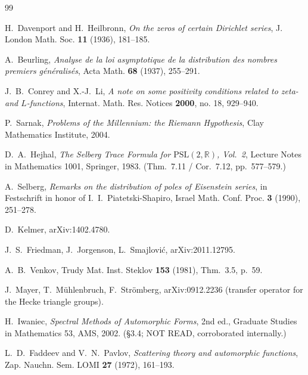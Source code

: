 \documentclass[11pt]{amsart}
\theoremstyle{remark}
\begin{document}
\begin{thebibliography}{99}

 H.~Davenport and H.~Heilbronn, \emph{On the zeros of
certain Dirichlet series}, J. London Math. Soc. \textbf{11} (1936),
181--185. %

 A.~Beurling, \emph{Analyse de la loi asymptotique
de la distribution des nombres premiers g\'en\'eralis\'es}, Acta Math.
\textbf{68} (1937), 255--291. %

 J.~B.~Conrey and X.-J.~Li, \emph{A note on some
positivity conditions related to zeta- and $L$-functions}, Internat.
Math. Res. Notices \textbf{2000}, no. 18, 929--940.

 P.~Sarnak, \emph{Problems of the Millennium: the
Riemann Hypothesis}, Clay Mathematics Institute, 2004.

 D.~A.~Hejhal, \emph{The Selberg Trace Formula for
$\mathrm{PSL}(2,\mathbb R)$, Vol.\ 2}, Lecture Notes in Mathematics 1001,
Springer, 1983. (Thm.\ 7.11 / Cor.\ 7.12, pp.\ 577--579.)

 A.~Selberg, \emph{Remarks on the distribution of
poles of Eisenstein series}, in Festschrift in honor of I.~I.~Piatetski-Shapiro,
Israel Math. Conf. Proc. \textbf{3} (1990), 251--278. %

 D.~Kelmer, arXiv:1402.4780. %

 J.~S.~Friedman, J.~Jorgenson, L.~Smajlovi\'c,
arXiv:2011.12795. %

 A.~B.~Venkov, Trudy Mat. Inst. Steklov \textbf{153}
(1981), Thm.\ 3.5, p.\ 59. %

 J.~Mayer, T.~M\"uhlenbruch, F.~Str\"omberg,
arXiv:0912.2236 (transfer operator for the Hecke triangle groups).

 H.~Iwaniec, \emph{Spectral Methods of Automorphic
Forms}, 2nd ed., Graduate Studies in Mathematics 53, AMS, 2002. (\S3.4;
NOT READ, corroborated internally.)

 L.~D.~Faddeev and V.~N.~Pavlov, \emph{Scattering
theory and automorphic functions}, Zap. Nauchn. Sem. LOMI \textbf{27}
(1972), 161--193. %


\end{thebibliography}
\end{document}
